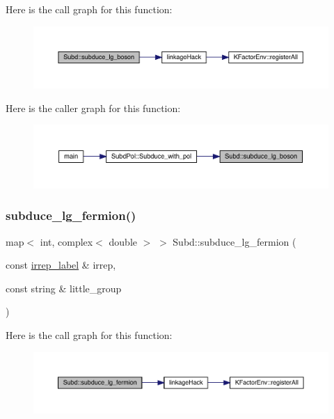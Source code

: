 Here is the call graph for this function\+:
\nopagebreak
\begin{figure}[H]
\begin{center}
\leavevmode
\includegraphics[width=350pt]{d8/d2b/namespaceSubd_a5f31b3ef70ad25320a8010ec3017eb04_cgraph}
\end{center}
\end{figure}
Here is the caller graph for this function\+:
\nopagebreak
\begin{figure}[H]
\begin{center}
\leavevmode
\includegraphics[width=350pt]{d8/d2b/namespaceSubd_a5f31b3ef70ad25320a8010ec3017eb04_icgraph}
\end{center}
\end{figure}
\mbox{\label{namespaceSubd_ae7ed68270fb8f7b5f574db245b085586}} 
\subsubsection{\texorpdfstring{subduce\_lg\_fermion()}{subduce\_lg\_fermion()}}
{\footnotesize\ttfamily map$<$ int, complex$<$ double $>$ $>$ Subd\+::subduce\+\_\+lg\+\_\+fermion (\begin{DoxyParamCaption}\item[{const \mbox{\hyperlink{structirrep__label}{irrep\+\_\+label}} \&}]{irrep,  }\item[{const string \&}]{little\+\_\+group }\end{DoxyParamCaption})}

Here is the call graph for this function\+:
\nopagebreak
\begin{figure}[H]
\begin{center}
\leavevmode
\includegraphics[width=350pt]{d8/d2b/namespaceSubd_ae7ed68270fb8f7b5f574db245b085586_cgraph}
\end{center}
\end{figure}
\mbox{\label{namespaceSubd_aa8b77162377de658856d44a4ac5aad26}} 
